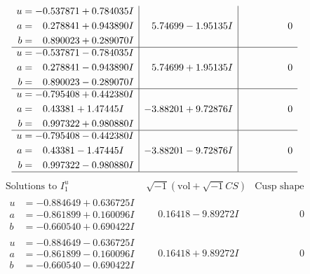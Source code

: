 \documentclass[1p]{elsarticle_modified}
\theoremstyle{definition}
\newcommand{\I}{\sqrt{-1}}
\begin{document}
$$\begin{array}{c|c|c}
\begin{aligned}
u &= -0.537871 + 0.784035 I \\
a &= \phantom{-}0.278841 + 0.943890 I \\
b &= \phantom{-}0.890023 + 0.289070 I\end{aligned}
 & \phantom{-}5.74699 - 1.95135 I & \phantom{-0.000000 } 0 \\ \hline\begin{aligned}
u &= -0.537871 - 0.784035 I \\
a &= \phantom{-}0.278841 - 0.943890 I \\
b &= \phantom{-}0.890023 - 0.289070 I\end{aligned}
 & \phantom{-}5.74699 + 1.95135 I & \phantom{-0.000000 } 0 \\ \hline\begin{aligned}
u &= -0.795408 + 0.442380 I \\
a &= \phantom{-}0.43381 + 1.47445 I \\
b &= \phantom{-}0.997322 + 0.980880 I\end{aligned}
 & -3.88201 + 9.72876 I & \phantom{-0.000000 } 0 \\ \hline\begin{aligned}
u &= -0.795408 - 0.442380 I \\
a &= \phantom{-}0.43381 - 1.47445 I \\
b &= \phantom{-}0.997322 - 0.980880 I\end{aligned}
 & -3.88201 - 9.72876 I & \phantom{-0.000000 } 0\\
 \hline 
 \end{array}$$\newpage$$\begin{array}{c|c|c}  
\text{Solutions to }I^u_{1}& \I (\text{vol} + \sqrt{-1}CS) & \text{Cusp shape}\\
 \hline 
\begin{aligned}
u &= -0.884649 + 0.636725 I \\
a &= -0.861899 + 0.160096 I \\
b &= -0.660540 + 0.690422 I\end{aligned}
 & \phantom{-}0.16418 - 9.89272 I & \phantom{-0.000000 } 0 \\ \hline\begin{aligned}
u &= -0.884649 - 0.636725 I \\
a &= -0.861899 - 0.160096 I \\
b &= -0.660540 - 0.690422 I\end{aligned}
 & \phantom{-}0.16418 + 9.89272 I & \phantom{-0.000000 } 0 \\ \hline\begin{aligned}

\end{aligned}
\end{array}$$
\end{document}
